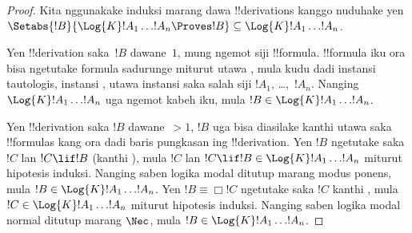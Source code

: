 \documentclass[../../../include/open-logic-section]{subfiles}
\begin{document}
\begin{proof}
  Kita nggunakake induksi marang dawa !!{derivation}s kanggo nuduhake
  yen $\Setabs{!B}{\Log{K} !A_1 \dots !A_n \Proves !B} \subseteq
  \Log{K} !A_1 \dots !A_n$.

Yen !!{derivation} saka~$!B$ dawane~$1$, mung ngemot siji
  !!{formula}. !!{formula} iku ora bisa ngetutake formula sadurunge
  miturut \MP{} utawa \Nec, mula kudu dadi instansi tautologis,
  instansi , utawa instansi
  saka salah siji $!A_1$, \dots,~$!A_n$. Nanging
  $\Log{K}!A_1\dots!A_n$ uga ngemot kabeh iku, mula
  $!B \in \Log{K}!A_1 \dots !A_n$.

Yen !!{derivation} saka $!B$ dawane~$> 1$, $!B$ uga
  bisa diasilake kanthi \MP{} utawa \Nec{} saka !!{formula}s kang
  ora dadi baris pungkasan ing !!{derivation}. Yen $!B$ ngetutake
  saka $!C$ lan $!C \lif !B$ (kanthi \MP), mula $!C$ lan
  $!C \lif !B \in \Log{K}!A_1 \dots !A_n$ miturut hipotesis induksi.
  Nanging saben logika modal ditutup marang modus ponens, mula
  $!B \in \Log{K}!A_1 \dots !A_n$. Yen $!B \equiv \Box !C$ ngetutake
  saka $!C$ kanthi \Nec, mula $!C \in \Log{K}!A_1 \dots !A_n$
  miturut hipotesis induksi. Nanging saben logika modal normal
  ditutup marang $\Nec$, mula $!B \in \Log{K}!A_1\dots!A_n$.


\end{proof}
\end{document}
